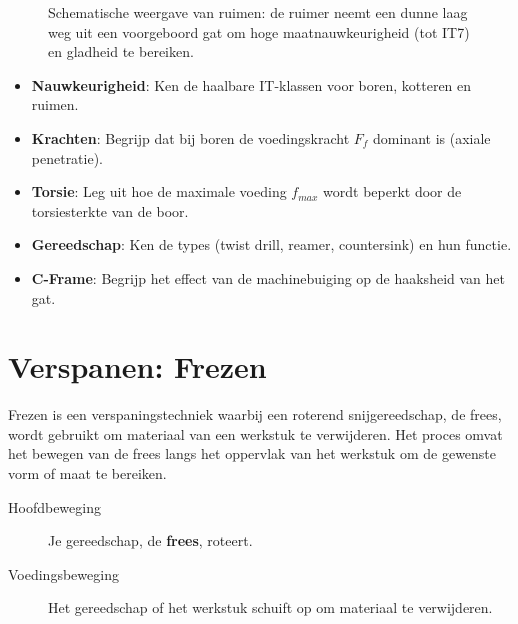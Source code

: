 \documentclass[a4paper,11pt,twoside]{report}
\begin{document}
\begin{figure}[htbp]
    \caption{Schematische weergave van ruimen: de ruimer neemt een dunne laag weg uit een voorgeboord gat om hoge maatnauwkeurigheid (tot IT7) en gladheid te bereiken.}
    \label{fig:ruimen}
\end{figure}
\FloatBarrier


\begin{warningbox}
    \begin{itemize}
        \item \textbf{Nauwkeurigheid}: Ken de haalbare IT-klassen voor boren, kotteren en ruimen.
        \item \textbf{Krachten}: Begrijp dat bij boren de voedingskracht $F_f$ dominant is (axiale penetratie).
        \item \textbf{Torsie}: Leg uit hoe de maximale voeding $f_{max}$ wordt beperkt door de torsiesterkte van de boor.
        \item \textbf{Gereedschap}: Ken de types (twist drill, reamer, countersink) en hun functie.
        \item \textbf{C-Frame}: Begrijp het effect van de machinebuiging op de haaksheid van het gat.
    \end{itemize}
\end{warningbox}

\chapter{Verspanen: Frezen}
\label{chap:Verspanen_Frezen}

Frezen is een verspaningstechniek waarbij een roterend snijgereedschap, de frees, wordt gebruikt om materiaal van een werkstuk te verwijderen.
Het proces omvat het bewegen van de frees langs het oppervlak van het werkstuk om de gewenste vorm of maat te bereiken.

\begin{description}
    \item[Hoofdbeweging] Je gereedschap, de \textbf{frees}, roteert.
    \item[Voedingsbeweging] Het gereedschap of het werkstuk schuift op om materiaal te verwijderen.
\end{description}
\end{document}
